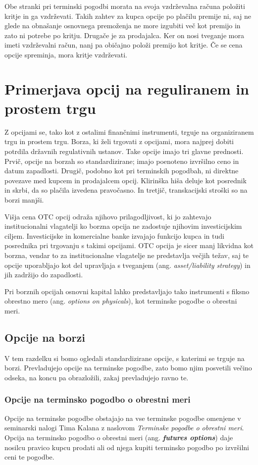 \documentclass[a4paper]{article}
\begin{document}
Obe stranki pri terminski pogodbi morata na svoja vzdrževalna računa položiti kritje in ga vzdrževati. Takih zahtev za kupca opcije
po plačilu premije ni, saj ne glede na obnašanje osnovnega premoženja ne more izgubiti več kot premijo in zato ni potrebe po kritju.
Drugače je za prodajalca. Ker on nosi tveganje mora imeti vzdrževalni račun, nanj pa običajno položi premijo kot kritje. Če se cena 
opcije spreminja, mora kritje vzdrževati.

\section{Primerjava opcij na reguliranem in prostem trgu}
Z opcijami se, tako kot z ostalimi finančnimi instrumenti, trguje na organiziranem trgu in prostem trgu. Borza, ki želi trgovati
z opcijami, mora najprej dobiti potrdila državnih regulativnih ustanov. Take opcije imajo tri glavne prednosti. Prvič, opcije na borzah
so standardizirane; imajo poenoteno izvršilno ceno in datum zapadlosti. Drugič, podobno kot pri terminskih pogodbah, ni direktne povezave
med kupcem in prodajalcem opcij. Klirinška hiša deluje kot posrednik in skrbi, da so plačila izvedena pravočasno. In tretjič, transkacijski
stroški so na borzi manjši. 

Višja cena OTC opcij odraža njihovo prilagodljivost, ki jo zahtevajo institucionalni vlagatelji ko borzna opcija ne zadostuje
njihovim investicijskim ciljem. Investicijske in komercialne banke izvajajo funkcijo kupca in tudi posrednika pri trgovanju s takimi
opcijami. OTC opcija je sicer manj likvidna kot borzna, vendar to za institucionalne vlagatelje ne predstavlja večjih težav, 
saj te opcije uporabljajo kot del upravljaja s tveganjem (ang. \textit{asset/liability strategy}) in jih zadržijo do zapadlosti.

Pri borznih opcijah osnovni kapital lahko predstavljajo tako instrumenti s fiksno obrestno mero (ang. \textit{options on physicals}),
kot terminske pogodbe o obrestni meri.

\subsection{Opcije na borzi}
V tem razdelku si bomo ogledali standardizirane opcije, s katerimi se trguje na borzi. Prevladujejo opcije na terminske pogodbe,
zato bomo njim posvetili večino odseka, na koncu pa obrazložili, zakaj prevladujejo ravno te.

\subsubsection{Opcije na terminsko pogodbo o obrestni meri}
Opcije na terminske pogodbe obstajajo na vse terminske pogodbe omenjene v seminarski nalogi Tima Kalana z naslovom \textit{Terminske
pogodbe o obrestni meri}. Opcija na terminsko pogodbo o obrestni meri (ang. \textit{\textbf{futures options}}) daje nosilcu pravico
kupcu prodati ali od njega kupiti terminsko pogodbo po izvršilni ceni te pogodbe.
\end{document}
